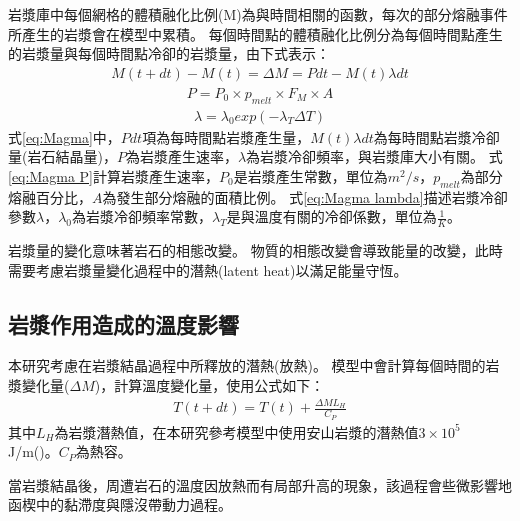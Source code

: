 岩漿庫中每個網格的體積融化比例(M)為與時間相關的函數，每次的部分熔融事件所產生的岩漿會在模型中累積。
每個時間點的體積融化比例分為每個時間點產生的岩漿量與每個時間點冷卻的岩漿量，由下式表示：
\begin{align}
    M(t+dt)-M(t) = \Delta M = Pdt-M(t)\lambda dt \label{eq:Magma}
\end{align}
\begin{align}
    P = P_0 \times p_{melt} \times F_M \times A \label{eq:Magma P}
\end{align}
\begin{align}
    \lambda = \lambda_0 exp(-\lambda_T\Delta T) \label{eq:Magma lambda}
\end{align}
式\ref{eq:Magma}中，$Pdt$項為每時間點岩漿產生量，$M(t)\lambda dt$為每時間點岩漿冷卻量(岩石結晶量)，$P$為岩漿產生速率，$\lambda$為岩漿冷卻頻率，與岩漿庫大小有關。
式\ref{eq:Magma P}計算岩漿產生速率，$P_0$是岩漿產生常數，單位為$m^2/s$，$p_{melt}$為部分熔融百分比，$A$為發生部分熔融的面積比例。
式\ref{eq:Magma lambda}描述岩漿冷卻參數$\lambda$，$\lambda_0$為岩漿冷卻頻率常數，$\lambda_T$是與溫度有關的冷卻係數，單位為$\frac{1}{K}$。

岩漿量的變化意味著岩石的相態改變。
物質的相態改變會導致能量的改變，此時需要考慮岩漿量變化過程中的潛熱(latent heat)以滿足能量守恆。
\subsection{岩漿作用造成的溫度影響}\label{岩漿作用造成的溫度影響}
本研究考慮在岩漿結晶過程中所釋放的潛熱(放熱)。
模型中會計算每個時間的岩漿變化量($\Delta M$)，計算溫度變化量，使用公式如下：
\begin{align}
    T(t+dt) = T(t) + \frac{\Delta M L_H}{C_P}\label{eq:latent heat}
\end{align}
其中$L_H$為岩漿潛熱值，在本研究參考模型中使用安山岩漿的潛熱值$3\times 10^5$ J/m(\citealp{liu2011modeling})。$C_P$為熱容。

當岩漿結晶後，周遭岩石的溫度因放熱而有局部升高的現象，該過程會些微影響地函楔中的黏滯度與隱沒帶動力過程。